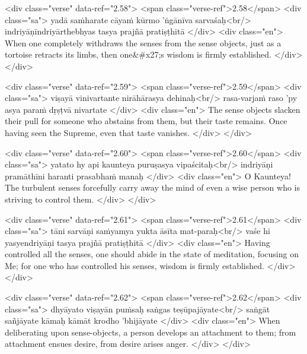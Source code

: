 \begin{html}
<div class="verse" data-ref="2.58">
  <span class="verse-ref">2.58</span>
  <div class="sa">
    yadā saṁharate cāyaṁ kūrmo ’ṅgānīva sarvaśaḥ<br/>
    indriyāṇīndriyārthebhyas tasya prajñā pratiṣṭhitā
  </div>
  <div class="en">
    When one completely withdraws the senses from the sense objects, just as a tortoise retracts its limbs, then one&#x27;s wisdom is firmly established.
  </div>
</div>
\end{html}



\begin{html}
<div class="verse" data-ref="2.59">
  <span class="verse-ref">2.59</span>
  <div class="sa">
    viṣayā vinivartante nirāhārasya dehinaḥ<br/>
    rasa-varjaṁ raso ’py asya paraṁ dṛṣṭvā nivartate
  </div>
  <div class="en">
    The sense objects slacken their pull for someone who abstains from them, but their taste remains. Once having seen the Supreme, even that taste vanishes.
  </div>
</div>
\end{html}



\begin{html}
<div class="verse" data-ref="2.60">
  <span class="verse-ref">2.60</span>
  <div class="sa">
    yatato hy api kaunteya puruṣasya vipaścitaḥ<br/>
    indriyāṇi pramāthīni haranti prasabhaṁ manaḥ
  </div>
  <div class="en">
    O Kaunteya! The turbulent senses forcefully carry away the mind of even a wise person who is striving to control them.
  </div>
</div>
\end{html}



\begin{html}
<div class="verse" data-ref="2.61">
  <span class="verse-ref">2.61</span>
  <div class="sa">
    tāni sarvāṇi saṁyamya yukta āsīta mat-paraḥ<br/>
    vaśe hi yasyendriyāṇi tasya prajñā pratiṣṭhitā
  </div>
  <div class="en">
    Having controlled all the senses, one should abide in the state of meditation, focusing on Me; for one who has controlled his senses, wisdom is firmly established.
  </div>
</div>
\end{html}



\begin{html}
<div class="verse" data-ref="2.62">
  <span class="verse-ref">2.62</span>
  <div class="sa">
    dhyāyato viṣayān puṁsaḥ saṅgas teṣūpajāyate<br/>
    saṅgāt sañjāyate kāmaḥ kāmāt krodho ’bhijāyate
  </div>
  <div class="en">
    When deliberating upon sense-objects, a person develops an attachment to them; from attachment ensues desire, from desire arises anger.
  </div>
</div>
\end{html}



